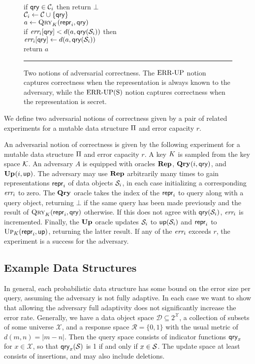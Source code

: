 \begin{figure}[t]
{    \\[2pt]
      if $\mathsf{qry} \in \mathcal{C}_i$ then return $\bot$\\
      $\mathcal{C}_i \gets \mathcal{C} \cup \{\mathsf{qry}\}$\\
      $a \gets \textsc{Qry}_K(\mathsf{repr}_i, \mathsf{qry})$\\
      if $\textit{err}_i[\mathsf{qry}] < d(a,\mathsf{qry}(\mathcal{S}_i))$ then\\
      \tab$\textit{err}_i[\mathsf{qry}] \gets d(a,\mathsf{qry}(\mathcal{S}_i))$\\
      return $a$
  }
  \caption{Two notions of adversarial correctness. The $\textnormal{ERR\mbox{-}UP}$ notion captures correctness when the representation is always known to the adversary, while the $\textnormal{ERR\mbox{-}UP(S)}$ notion captures correctness when the representation is secret.}
  \vspace{6pt}\hrule
  \label{fig:security}
\end{figure}

We define two adversarial notions of correctness given by a pair of related experiments for a mutable data structure $\mathrm{\Pi}$ and error capacity $r$.

An adversarial notion of correctness is given by the following experiment for a mutable data structure $\mathrm{\Pi}$ and error capacity $r$. A key $K$ is sampled from the key space $\mathcal{K}$. An adversary $A$ is equipped with oracles $\mathbf{Rep}\hspace{0.5pt}$, $\mathbf{Qry}\hspace{0.5pt}(i,\mathsf{qry})$, and $\mathbf{Up}\hspace{0.5pt}(i,\mathsf{up})$. The adversary may use $\mathbf{Rep}\hspace{0.5pt}$ arbitrarily many times to gain representations $\mathsf{repr}_i$ of data objects $\mathcal{S}_i$, in each case initializing a corresponding $\textit{err}_i$ to zero. The $\mathbf{Qry}\hspace{0.5pt}$ oracle takes the index of the $\mathsf{repr}_i$ to query along with a query object, returning $\bot$ if the same query has been made previously and the result of $\textsc{Qry}_K(\mathsf{repr}_i,\mathsf{qry})$ otherwise. If this does not agree with $\mathsf{qry}(\mathcal{S}_i)$, $\textit{err}_i$ is incremented. Finally, the $\mathbf{Up}\hspace{0.5pt}$ oracle updates $\mathcal{S}_i$ to $\mathsf{up}(\mathcal{S}_i)$ and $\mathsf{repr}_i$ to $\textsc{Up}_K(\mathsf{repr}_i,\mathsf{up})$, returning the latter result. If any of the $\textit{err}_i$ exceeds $r$, the experiment is a success for the adversary.

\subsection{Example Data Structures}

In general, each probabilistic data structure has some bound on the error size per query, assuming the adversary is not fully adaptive. In each case we want to show that allowing the adversary full adaptivity does not significantly increase the error rate. Generally, we have a data object space $\mathcal{D} \subseteq 2^\mathcal{X}$, a collection of subsets of some universe $\mathcal{X}$, and a response space $\mathcal{R} = \{0,1\}$ with the usual metric of $d(m,n) = |m-n|$. Then the query space consists of indicator functions $\mathsf{qry}_x$ for $x \in \mathcal{X}$, so that $\mathsf{qry}_x(\mathcal{S})$ is 1 if and only if $x \in \mathcal{S}$. The update space at least consists of insertions, and may also include deletions.

